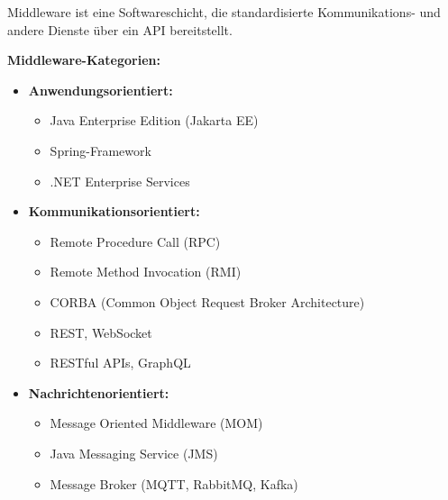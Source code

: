 \begin{definition}{Middleware} ist eine Softwareschicht, die standardisierte Kommunikations- und andere Dienste über ein API bereitstellt.

\textbf{Middleware-Kategorien:}
\begin{itemize}
    \item \textbf{Anwendungsorientiert:}
    \begin{itemize}
        \item Java Enterprise Edition (Jakarta EE)
        \item Spring-Framework
        \item .NET Enterprise Services
    \end{itemize}
    
    \item \textbf{Kommunikationsorientiert:}
    \begin{itemize}
        \item Remote Procedure Call (RPC)
        \item Remote Method Invocation (RMI)
        \item CORBA (Common Object Request Broker Architecture)
        \item REST, WebSocket
        \item RESTful APIs, GraphQL
    \end{itemize}
    
    \item \textbf{Nachrichtenorientiert:}
    \begin{itemize}
        \item Message Oriented Middleware (MOM)
        \item Java Messaging Service (JMS)
        \item Message Broker (MQTT, RabbitMQ, Kafka)
    \end{itemize}
\end{itemize}
\end{definition}

